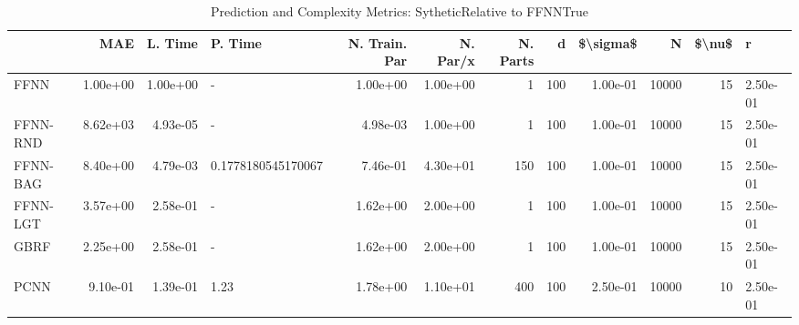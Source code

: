 \begin{table}
\centering
\caption{Prediction and Complexity Metrics: SytheticRelative to FFNNTrue}
\label{tab__Sythetic__Fix_Neurons_QTrue}
\begin{tabular}{lrrlrrrrrrr}
\toprule
{} &      MAE &  L. Time &              P. Time &  N. Train. Par &  N. Par/x &  N. Parts &    d &  \$\textbackslash sigma\$ &      N &  \$\textbackslash nu\$ &        r \\
\midrule
FFNN     & 1.00e+00 & 1.00e+00 &                    - &       1.00e+00 &  1.00e+00 &         1 &  100 &  1.00e-01 &  10000 &     15 & 2.50e-01 \\
FFNN-RND & 8.62e+03 & 4.93e-05 &                    - &       4.98e-03 &  1.00e+00 &         1 &  100 &  1.00e-01 &  10000 &     15 & 2.50e-01 \\
FFNN-BAG & 8.40e+00 & 4.79e-03 &   0.1778180545170067 &       7.46e-01 &  4.30e+01 &       150 &  100 &  1.00e-01 &  10000 &     15 & 2.50e-01 \\
FFNN-LGT & 3.57e+00  & 2.58e-01 &                    - &       1.62e+00 &  2.00e+00 &         1 &  100 &  1.00e-01 &  10000 &     15 & 2.50e-01 \\
GBRF     & 2.25e+00  & 2.58e-01 &                    - &       1.62e+00 &  2.00e+00 &         1 &  100 &  1.00e-01 &  10000 &     15 & 2.50e-01 \\
PCNN     & 9.10e-01 & 1.39e-01 &  1.23 &       1.78e+00 &       1.10e+01 & 400 &    100 &2.50e-01 &  10000 &     10 & 2.50e-01 \\
\bottomrule
\end{tabular}
\end{table}
